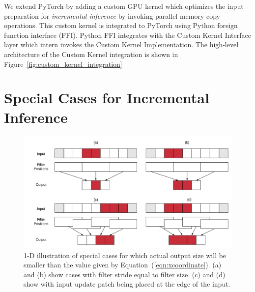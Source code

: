 We extend PyTorch by adding a custom GPU kernel which optimizes the input preparation for \textit{incremental inference} by invoking parallel memory copy operations.
This custom kernel is integrated to PyTorch using Python foreign function interface (FFI).
Python FFI integrates with the Custom Kernel Interface layer which intern invokes the Custom Kernel Implementation.
The high-level architecture of the Custom Kernel integration is shown in Figure~\ref{fig:custom_kernel_integration}


\section{Special Cases for Incremental Inference}

\begin{figure}[t]
\includegraphics[width=\columnwidth]{images/less_one_example}
\vspace{-6mm}
\caption{1-D illustration of special cases for which actual output size will be smaller than the value given by Equation~(\ref{eqn:xcoordinate}). (a) and (b) show cases with filter stride equal to filter size. (c) and (d) show with input update patch being placed at the edge of the input.}
\vspace{-4mm}
\label{fig:less_one_example}
\end{figure}

